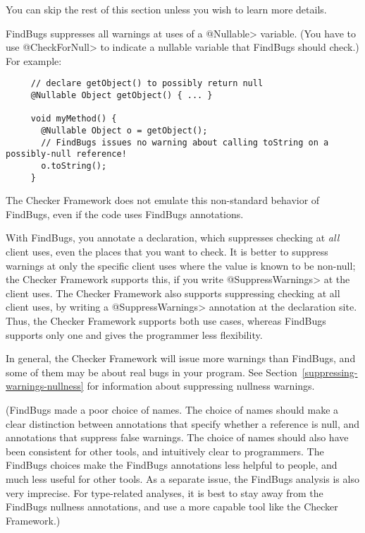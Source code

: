 You can skip the rest of this section unless you wish to learn more details.

FindBugs suppresses all warnings at uses of a \<@Nullable> variable.
(You have to use \<@CheckForNull> to
indicate a nullable variable that FindBugs should check.)  For example:

\begin{Verbatim}
     // declare getObject() to possibly return null
     @Nullable Object getObject() { ... }

     void myMethod() {
       @Nullable Object o = getObject();
       // FindBugs issues no warning about calling toString on a possibly-null reference!
       o.toString();
     }
\end{Verbatim}

\noindent
The Checker Framework does not emulate this non-standard behavior of
FindBugs, even if the code uses FindBugs annotations.

With FindBugs, you annotate a declaration, which suppresses checking at
\emph{all} client uses, even the places that you want to check.
It is better to suppress warnings at only the specific client uses
where the value is known to be non-null; the Checker Framework supports
this, if you write \<@SuppressWarnings> at the client uses.
The Checker Framework also supports suppressing checking at all client uses,
by writing a \<@SuppressWarnings> annotation at the declaration site.
Thus, the Checker Framework supports both use cases, whereas FindBugs
supports only one and gives the programmer less flexibility.

In general, the Checker Framework will issue more warnings than FindBugs,
and some of them may be about real bugs in your program.
See Section~\ref{suppressing-warnings-nullness} for information about
suppressing nullness warnings.

(FindBugs made a poor choice of names.  The choice of names should make a
clear distinction between annotations that specify whether a reference is
null, and annotations that suppress false warnings.  The choice of names
should also have been consistent for other tools, and intuitively clear to
programmers.  The FindBugs choices make the FindBugs annotations less
helpful to people, and much less useful for other tools.  As a separate
issue, the FindBugs
analysis is also very imprecise.  For type-related analyses, it is best to
stay away from the FindBugs nullness annotations, and use a more capable
tool like the Checker Framework.)



